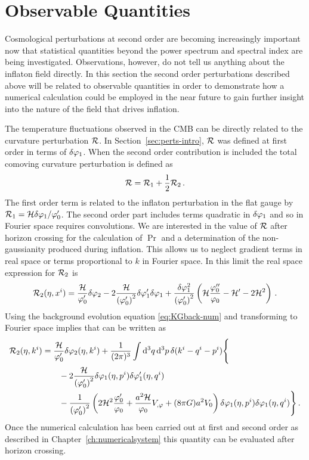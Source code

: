 \section{Observable Quantities}
\label{sec:observable-perts}

Cosmological perturbations at second order are becoming increasingly important now
that
statistical quantities beyond the power spectrum and spectral index are being
investigated. Observations, however, do not tell us anything about the inflaton
field directly. In this section the second order perturbations described above will
be related to observable quantities in order to demonstrate how a numerical
calculation could
be employed in the near future to gain further insight into the nature of the field
that drives inflation.
% 

The temperature fluctuations observed in the CMB can
be directly related to the curvature perturbation $\mathcal{R}$. In
Section~\ref{sec:perts-intro}, $\mathcal{R}$ was defined at first order in terms of $\delta\varphi_{1}$.
When the second order contribution is included the total comoving curvature
perturbation is defined as
% 
\begin{equation}
\label{eq:Rfulldefn-perts}
 \mathcal{R} = \mathcal{R}_1 + \frac{1}{2}\mathcal{R}_2\,.
\end{equation}
% 
The first order term is related to the inflaton perturbation in the flat gauge by
$\mathcal{R}_1
= \mathcal{H}\delta\varphi_{1}/\varphi_0'$. The second order part includes terms quadratic in $\delta\varphi_{1}$ and so
in Fourier space requires convolutions. We are interested in the value of $\mathcal{R}$ after
horizon crossing for the calculation of $\Pr$ and a determination of the
non-gaussianity produced during inflation. This allows us to neglect gradient terms
in real space or terms proportional to $k$ in Fourier space.
In this limit the real space expression for $\mathcal{R}_2$ is \cite{Malik:2005cy}
% 
\begin{equation}
 \label{eq:R2real-perts}
\mathcal{R}_2(\eta, x^i) = \frac{\mathcal{H}}{\varphi_0'}\delta\varphi_{2} - 2\frac{\mathcal{H}}{\left(\varphi_0'\right)^2}
\delta\varphi_{1}'\delta\varphi_{1} + \frac{\delta\varphi_{1}^2}{\left(\varphi_0'\right)^2}\left(\mathcal{H}\frac{\varphi_0''}{\varphi_0} 
 - \mathcal{H}' -2\mathcal{H}^2 \right)\,.
\end{equation}
% 
Using the background evolution equation \eqref{eq:KGback-num} and transforming to
Fourier space implies that  can be written as
% 
\begin{align}
 \R_2(\eta, \kvi) &= \frac{\H}{\vp_0'}\dvp2(\eta, \kvi) 
  + \frac{1}{(2\pi)^3}\int \d^3q\, \d^3p\, \delta(\kvi-\qvi-\pvi) \Bigg\{
\nonumber\\
% 
 &\qquad -2\frac{\H}{\left(\vp_0'\right)^2} \dvp1(\eta, \pvi)\dvp1'(\eta, \qvi) \nonumber\\
%  
&\qquad -\frac{1}{\left(\vp_0'\right)^2} \left(
  2\H^2 \frac{\vp_0'}{\vp_0} + \frac{a^2 \H}{\vp_0}\Uphi + (8\pi G)a^2 \U
 \right)
\dvp1(\eta,\pvi) \dvp1(\eta, \qvi)\Bigg\}\,.
\end{align}
% 
Once the numerical calculation has been carried out at first and second order as
described in Chapter~\ref{ch:numericalsystem} this quantity can be evaluated after
horizon crossing.

